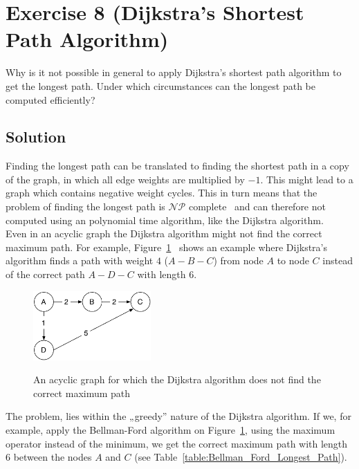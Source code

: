 \documentclass[a4paper, 12pt]{report}
\begin{document}
\section{Exercise 8 (Dijkstra’s Shortest Path Algorithm)}

Why is it not possible in general to apply Dijkstra’s shortest path algorithm
to get the longest path. Under which circumstances can the longest path be
computed efficiently?

\subsection{Solution}

Finding the longest path can be translated to finding the shortest path in a
copy of the graph, in which all edge weights are multiplied by $-1$. This might
lead to a graph which contains negative weight cycles. This in turn means that
the problem of finding the longest path is $\mathcal{NP}$
complete~\cite{Algorithmics_Slides} and can therefore not computed using an
polynomial time algorithm, like the Dijkstra algorithm.\\

Even in an acyclic graph the Dijkstra algorithm might not find the correct
maximum path. For example,
Figure~\ref{figure:Dijkstra_Counter_Example}~\cite{Dijkstra_Longest_Path} shows
an example where Dijkstra’s algorithm finds a path with weight $4$ ($A-B-C$)
from node $A$ to node $C$ instead of the correct path $A-D-C$ with length $6$.\\

\begin{figure}[htbp]
    \caption{
        An acyclic graph for which the Dijkstra algorithm does not find the
        correct maximum path
    }
    \vskip 0.2cm
    \centering
    \includegraphics[width=0.4\textwidth]{Figures/Dijkstra_Counter_Example}
    \label{figure:Dijkstra_Counter_Example}
\end{figure}

The problem, lies within the „greedy” nature of the Dijkstra algorithm. If
we, for example, apply the Bellman-Ford algorithm on
Figure~\ref{figure:Dijkstra_Counter_Example}, using the maximum operator instead
of the minimum, we get the correct maximum path with length $6$ between the
nodes $A$ and $C$ (see Table~\ref{table:Bellman_Ford_Longest_Path}).\\
\end{document}
